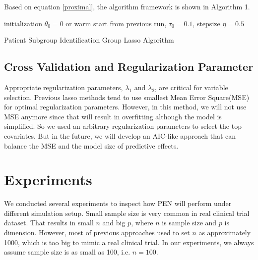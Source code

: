 \documentclass[12pt]{article}
\begin{document}
  Based on equation \ref{proximal}, the algorithm framework is shown in Algorithm 1.


\begin{algorithm}[H]
  initialization $\theta_0=0$ or warm start from previous run, $\tau_0=0.1$, stepsize $\eta=0.5$\;
  \caption{Patient Subgroup Identification Group Lasso Algorithm}
 \end{algorithm}
 
\subsection{Cross Validation and Regularization Parameter}

Appropriate regularization parameters, $\lambda_1$ and $\lambda_2$, are critical
for variable selection. Previous lasso methods tend to use smallest Mean Error Square(MSE)
for optimal regularization parameters. However, in this method, we will not use
MSE anymore since that will result in overfitting although the model is simplified.
So we used an arbitrary regularization parameters to select the top covariates.
But in the future, we will develop an AIC-like approach that can balance the MSE
and the model size of predictive effects. 

\section{Experiments}

We conducted several experiments to inspect how PEN will perform under
different simulation setup. Small sample size is very common in real clinical trial dataset.
That results in small $n$ and big $p$, where $n$ is sample size and $p$ is dimension. 
However, most of previous approaches used to set $n$ as
approximately 1000, which is too big to mimic a real clinical trial. 
In our experiments, we always assume
sample size is as small as 100, i.e. $n=100$. 
\end{document}

